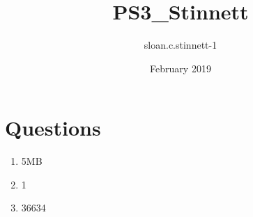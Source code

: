\documentclass{article}
\title{PS3_Stinnett}
\author{sloan.c.stinnett-1 }
\date{February 2019}
\begin{document}
\maketitle
\section{Questions}
\begin{enumerate}
    \item5MB
    \item1
    \item36634
\end{enumerate}
\end{document}
